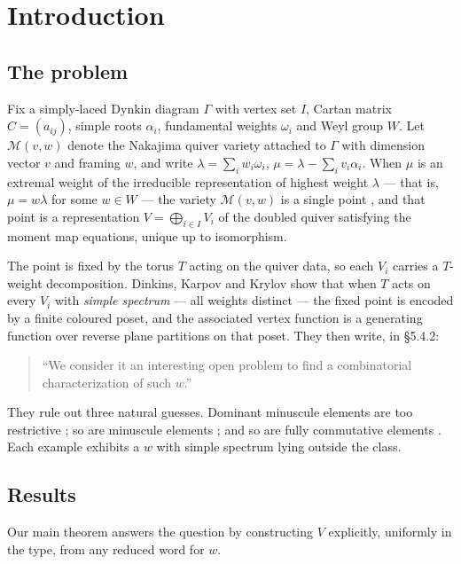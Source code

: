 \documentclass[11pt,reqno]{amsart}
\theoremstyle{plain}
\theoremstyle{definition}
\newcommand{\al}{\alpha}
\newcommand{\om}{\omega}
\newcommand{\la}{\lambda}
\newcommand{\Mvw}{\mathcal{M}}
\begin{document}
\maketitle

\section{Introduction}

\subsection{The problem}
Fix a simply-laced Dynkin diagram $\Gamma$ with vertex set $I$, Cartan matrix
$C=(a_{ij})$, simple roots $\al_i$, fundamental weights $\om_i$ and Weyl group
$W$.  Let $\Mvw(v,w)$ denote the Nakajima quiver variety attached to
$\Gamma$ with dimension vector $v$ and framing $w$, and write
$\la=\sum_i w_i\om_i$, $\mu=\la-\sum_i v_i\al_i$.  When $\mu$ is an extremal
weight of the irreducible representation of highest weight $\la$ --- that is,
$\mu=w\la$ for some $w\in W$ --- the variety $\Mvw(v,w)$ is a single point
\cite{Nak,ST}, and that point is a representation $V=\bigoplus_{i\in I}V_i$ of
the doubled quiver satisfying the moment map equations, unique up to
isomorphism.

The point is fixed by the torus $T$ acting on the quiver data, so each $V_i$
carries a $T$-weight decomposition.  Dinkins, Karpov and Krylov show
\cite[Thm.~5.6, Thm.~5.7]{DKK} that when $T$ acts on every $V_i$ with
\emph{simple spectrum} --- all weights distinct --- the fixed point is encoded
by a finite coloured poset, and the associated vertex function is a generating
function over reverse plane partitions on that poset.  They then write, in
\S5.4.2:

\begin{quote}
``We consider it an interesting open problem to find a combinatorial
characterization of such $w$.''
\end{quote}

They rule out three natural guesses.  Dominant minuscule elements are too
restrictive \cite[Ex.~5.10]{DKK}; so are minuscule elements
\cite[Ex.~5.11]{DKK}; and so are fully commutative elements
\cite[Ex.~5.12]{DKK}.  Each example exhibits a $w$ with simple spectrum lying
outside the class.

\subsection{Results}
Our main theorem answers the question by constructing $V$ explicitly, uniformly
in the type, from any reduced word for $w$.
\end{document}

